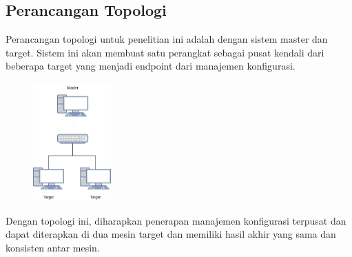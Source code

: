 \documentclass[10pt,]{report}
\begin{document}
\begin{adjustwidth}{7mm}{}
	\subsection{Perancangan Topologi}
	\begin{adjustwidth}{7mm}{}
		\hspace\parindent
		Perancangan topologi untuk penelitian ini adalah dengan sistem master dan
		target. Sistem ini akan membuat satu perangkat sebagai pusat kendali dari
		beberapa target yang menjadi endpoint dari manajemen konfigurasi.\\
		\begin{figure}[H]
			\centering
			\includegraphics[width=3cm]{images/topologi.png}
		\end{figure}
		Dengan topologi ini, diharapkan penerapan manajemen konfigurasi terpusat
		dan dapat diterapkan di dua mesin target dan memiliki hasil akhir yang sama
		dan konsisten antar mesin.\\
	\end{adjustwidth}
\end{adjustwidth}
\end{document}
